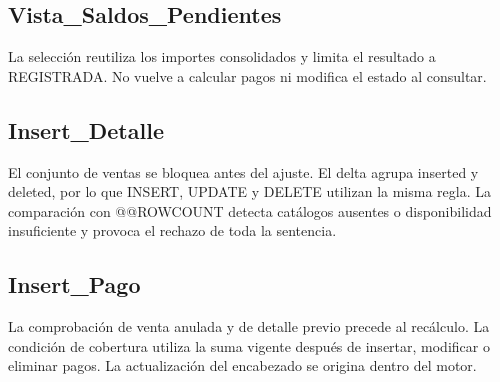 \documentclass[10pt,letterpaper]{article}
\begin{document}
\par\medskip\noindent\begin{minipage}{\textwidth}\subsection{Vista\_Saldos\_Pendientes}

La selección reutiliza los importes consolidados y limita el resultado a REGISTRADA. No vuelve a calcular pagos ni modifica el estado al consultar.



\end{minipage}\par\medskip

\par\medskip\noindent\begin{minipage}{\textwidth}\subsection{Insert\_Detalle}

El conjunto de ventas se bloquea antes del ajuste. El delta agrupa inserted y deleted, por lo que INSERT, UPDATE y DELETE utilizan la misma regla. La comparación con @@ROWCOUNT detecta catálogos ausentes o disponibilidad insuficiente y provoca el rechazo de toda la sentencia.



\end{minipage}\par\medskip

\par\medskip\noindent\begin{minipage}{\textwidth}\subsection{Insert\_Pago}

La comprobación de venta anulada y de detalle previo precede al recálculo. La condición de cobertura utiliza la suma vigente después de insertar, modificar o eliminar pagos. La actualización del encabezado se origina dentro del motor.



\end{minipage}\par\medskip
\end{document}
